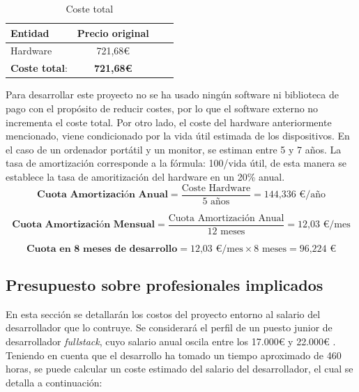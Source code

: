 \begin{table}[H]
    \begin{center}
    \begin{tabular}{| l | c | c | c |}
        \hline
        \textbf{Entidad} & \textbf{Precio original} \\ \hline
        Hardware & 721,68\euro \\ \hline
        \textbf{Coste total}: & \textbf{721,68\euro} \\ \hline
    \end{tabular}
    \caption{Coste total}
    \label{tab:coste-total}
    \end{center}
\end{table} 

Para desarrollar este proyecto no se ha usado ningún software ni biblioteca de pago con el propósito de reducir costes, por lo que el software externo no incrementa el coste total. Por otro lado, el coste del hardware anteriormente mencionado, viene condicionado por la vida útil estimada de los dispositivos. En el caso de un ordenador portátil y un monitor, se estiman entre 5 y 7 años. La tasa de amortización corresponde a la fórmula: 100/vida útil, de esta manera se establece la tasa de amoritización del hardware en un 20\% anual\cite{fleet_amortizacion_ordenadores}\cite{holded_amortizacion_equipos}.
\begin{equation}
    \textbf{Cuota Amortización Anual} = \frac {\text{Coste Hardware}}{\text{5 años}} = \text{144,336 €/año}
\end{equation}

\begin{equation}
    \textbf{Cuota Amortización Mensual} = \frac {\text{Cuota Amortización Anual}}{\text{12 meses}} = \text{12,03 €/mes}
\end{equation}

\begin{equation}
    \textbf{Cuota en 8 meses de desarrollo} =\text{12,03 €/mes} \times \text{8 meses} = \text{96,224 €}
\end{equation}

\subsection{Presupuesto sobre profesionales implicados}
En esta sección se detallarán los costos del proyecto entorno al salario del desarrollador que lo contruye. Se considerará el perfil de un puesto junior de desarrollador \textit{fullstack}, cuyo salario anual oscila entre los 17.000€ y 22.000€ \cite{glassdoor2024}.
Teniendo en cuenta que el desarrollo ha tomado un tiempo aproximado de 460 horas, se puede calcular un coste estimado del salario del desarrollador, el cual se detalla a continuación:

